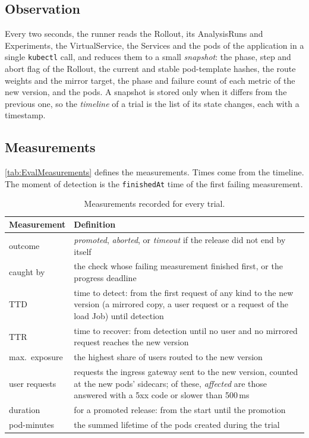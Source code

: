 \subsection{Observation}
\label{sec:EvalObservation}
Every two seconds, the runner reads the Rollout, its AnalysisRuns and Experiments, the VirtualService, the Services and the pods of the application in a single \texttt{kubectl} call, and reduces them to a small \emph{snapshot}: the phase, step and abort flag of the Rollout, the current and stable pod-template hashes, the route weights and the mirror target, the phase and failure count of each metric of the new version, and the pods. A snapshot is stored only when it differs from the previous one, so the \emph{timeline} of a trial is the list of its state changes, each with a timestamp.

\subsection{Measurements}
\label{sec:EvalMeasurements}
\autoref{tab:EvalMeasurements} defines the measurements. Times come from the timeline. The moment of detection is the \texttt{finishedAt} time of the first failing measurement.

\begin{table}[ht]
	\footnotesize
	\centering
	\begin{tabular}{ l p{11cm} }
		\toprule
		Measurement & Definition \\
		\midrule
		outcome & \emph{promoted}, \emph{aborted}, or \emph{timeout} if the release did not end by itself \\ \addlinespace
		caught by & the check whose failing measurement finished first, or the progress deadline \\ \addlinespace
		TTD & time to detect: from the first request of any kind to the new version (a mirrored copy, a user request or a request of the load Job) until detection \\ \addlinespace
		TTR & time to recover: from detection until no user and no mirrored request reaches the new version \\ \addlinespace
		max.\ exposure & the highest share of users routed to the new version \\ \addlinespace
		user requests & requests the ingress gateway sent to the new version, counted at the new pods' sidecars; of these, \emph{affected} are those answered with a 5xx code or slower than 500\,ms \\ \addlinespace
		duration & for a promoted release: from the start until the promotion \\ \addlinespace
		pod-minutes & the summed lifetime of the pods created during the trial \\
		\bottomrule
	\end{tabular}
	\caption{Measurements recorded for every trial.}
	\label{tab:EvalMeasurements}
\end{table}

